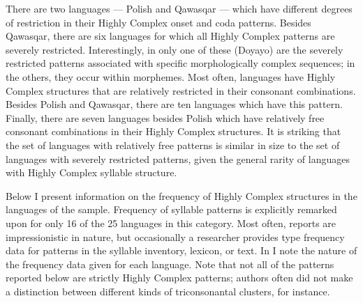   There are two languages — Polish and Qawasqar — which have different degrees of restriction in their Highly Complex onset and coda patterns. Besides Qawasqar, there are six languages for which all Highly Complex patterns are severely restricted. Interestingly, in only one of these (Doyayo) are the severely restricted patterns associated with specific morphologically complex sequences; in the others, they occur within morphemes. Most often, languages have Highly Complex structures that are relatively restricted in their consonant combinations. Besides Polish and Qawasqar, there are ten languages which have this pattern. Finally, there are seven languages besides Polish which have relatively free consonant combinations in their Highly Complex structures. It is striking that the set of languages with relatively free patterns is similar in size to the set of languages with severely restricted patterns, given the general rarity of languages with Highly Complex syllable structure.

  Below I present information on the frequency of Highly Complex structures in the languages of the sample. Frequency of syllable patterns is explicitly remarked upon for only 16 of the 25 languages in this category. Most often, reports are impressionistic in nature, but occasionally a researcher provides type frequency data for patterns in the syllable inventory, lexicon, or text. In  I note the nature of the frequency data given for each language. Note that not all of the patterns reported below are strictly Highly Complex patterns; authors often did not make a distinction between different kinds of triconsonantal clusters, for instance.

